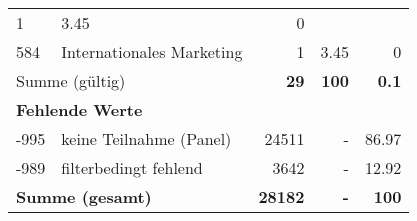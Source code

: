 \begin{longtable}{lXrrr}
       \num{1} &
       \num[round-mode=places,round-precision=2]{3,45} &
         \num[round-mode=places,round-precision=2]{0} \\

     584 &
     \multicolumn{1}{X}{ Internationales Marketing   } &


       \num{1} &
       \num[round-mode=places,round-precision=2]{3,45} &
         \num[round-mode=places,round-precision=2]{0} \\
     \midrule
     \multicolumn{2}{l}{Summe (gültig)} &
       \textbf{\num{29}} &
     \textbf{100} &
       \textbf{\num[round-mode=places,round-precision=2]{0,1}} \\
     \multicolumn{5}{l}{\textbf{Fehlende Werte}}\\
       -995 &
       keine Teilnahme (Panel) &
         \num{24511} &
        - &
         \num[round-mode=places,round-precision=2]{86,97} \\
       -989 &
       filterbedingt fehlend &
         \num{3642} &
        - &
         \num[round-mode=places,round-precision=2]{12,92} \\
     \midrule
     \multicolumn{2}{l}{\textbf{Summe (gesamt)}} &
          \textbf{\num{28182}} &
        \textbf{-} &
        \textbf{100} \\
     \bottomrule
     \end{longtable}
     
